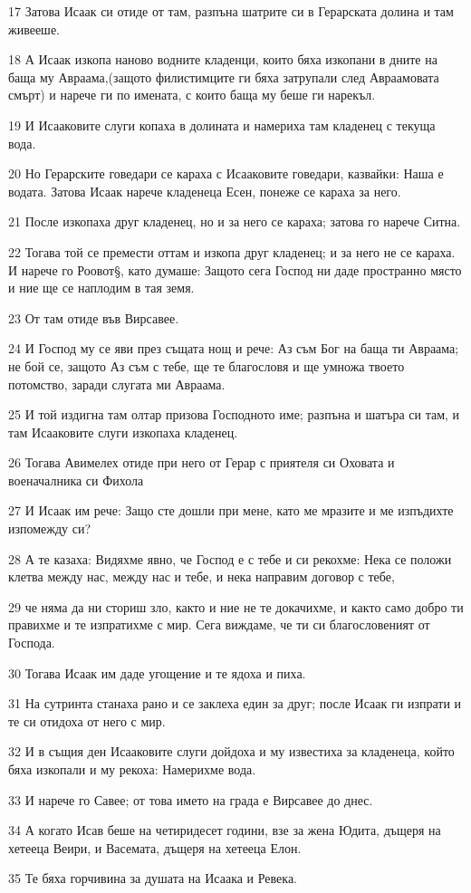\par 17 Затова Исаак си отиде от там, разпъна шатрите си в Герарската долина и там живееше.
\par 18 А Исаак изкопа наново водните кладенци, които бяха изкопани в дните на баща му Авраама,(защото филистимците ги бяха затрупали след Авраамовата смърт) и нарече ги по имената, с които баща му беше ги нарекъл.
\par 19 И Исааковите слуги копаха в долината и намериха там кладенец с текуща вода.
\par 20 Но Герарските говедари се караха с Исааковите говедари, казвайки: Наша е водата. Затова Исаак нарече кладенеца Есен, понеже се караха за него.
\par 21 После изкопаха друг кладенец, но и за него се караха; затова го нарече Ситна.
\par 22 Тогава той се премести оттам и изкопа друг кладенец; и за него не се караха. И нарече го Роовот§, като думаше: Защото сега Господ ни даде пространно място и ние ще се наплодим в тая земя.
\par 23 От там отиде във Вирсавее.
\par 24 И Господ му се яви през същата нощ и рече: Аз съм Бог на баща ти Авраама; не бой се, защото Аз съм с тебе, ще те благословя и ще умножа твоето потомство, заради слугата ми Авраама.
\par 25 И той издигна там олтар призова Господното име; разпъна и шатъра си там, и там Исааковите слуги изкопаха кладенец.
\par 26 Тогава Авимелех отиде при него от Герар с приятеля си Оховата и военачалника си Фихола
\par 27 И Исаак им рече: Защо сте дошли при мене, като ме мразите и ме изпъдихте изпомежду си?
\par 28 А те казаха: Видяхме явно, че Господ е с тебе и си рекохме: Нека се положи клетва между нас, между нас и тебе, и нека направим договор с тебе,
\par 29 че няма да ни сториш зло, както и ние не те докачихме, и както само добро ти правихме и те изпратихме с мир. Сега виждаме, че ти си благословеният от Господа.
\par 30 Тогава Исаак им даде угощение и те ядоха и пиха.
\par 31 На сутринта станаха рано и се заклеха един за друг; после Исаак ги изпрати и те си отидоха от него с мир.
\par 32 И в същия ден Исааковите слуги дойдоха и му известиха за кладенеца, който бяха изкопали и му рекоха: Намерихме вода.
\par 33 И нарече го Савее; от това името на града е Вирсавее до днес.
\par 34 А когато Исав беше на четиридесет години, взе за жена Юдита, дъщеря на хетееца Веири, и Васемата, дъщеря на хетееца Елон.
\par 35 Те бяха горчивина за душата на Исаака и Ревека.

